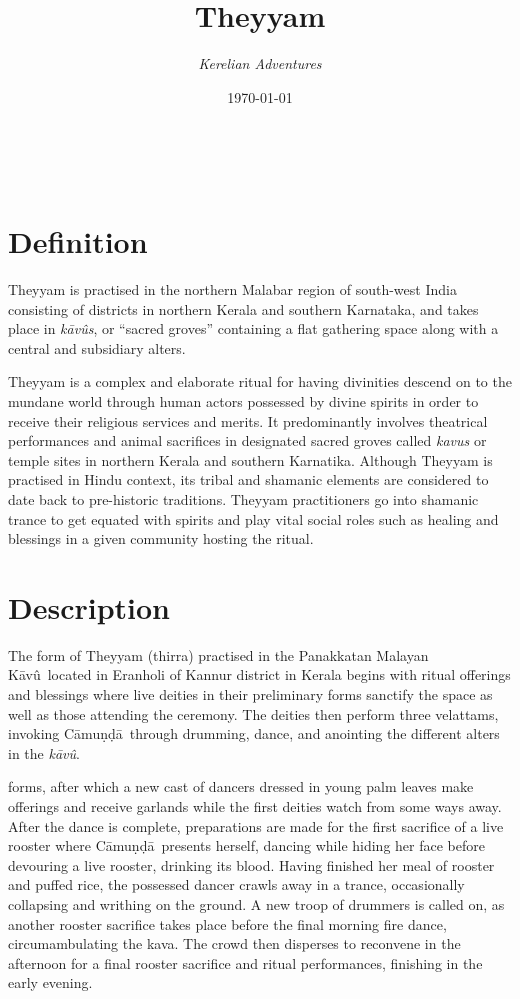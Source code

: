 \documentclass[a4paper, 11pt]{article} %
\title{\textbf{Theyyam}} %
\author{\textit{Kerelian Adventures}} %
\date{\today} %
\makeatletter
\newcommand{\camunda}[0]{C\={a}mu\d{n}\d{d}\={a}}
\newcommand{\kavu}[0]{\textit{k\={a}v\^{u}}}
\newcommand{\Kavu}[0]{K\={a}v\^{u}}
\renewcommand{\maketitle}{ %
\begin{flushright} %
{\LARGE\@title} %

\vspace{10pt} %

{\@author} %
\\\@date %

\vspace{30pt} %
\end{flushright}
}
\makeatother
\begin{document}
\maketitle %

\thispagestyle{empty}


\section{Definition}
  \label{sec:Definition}

Theyyam is practised in the northern Malabar region of south-west India consisting of districts in northern Kerala and southern Karnataka, and takes place in \textit{\kavu s}, or ``sacred groves'' containing a flat gathering space along with a central and subsidiary alters.

Theyyam is a complex and elaborate ritual for having divinities descend on to the mundane world through human actors possessed by divine spirits in order to receive their religious services and merits.
It predominantly involves theatrical performances and animal sacrifices in designated sacred groves called \textit{kavus} or temple sites in northern Kerala and southern Karnatika.
Although Theyyam is practised in Hindu context, its tribal and shamanic elements are considered to date back to pre-historic traditions.
Theyyam practitioners go into shamanic trance to get equated with spirits and play vital social roles such as healing and blessings in a given community hosting the ritual.

\section{Description}%
  \label{sec:Description}
  
The form of Theyyam (thirra) practised in the Panakkatan Malayan \Kavu\ located in Eranholi of Kannur district in Kerala begins with ritual offerings and blessings where live deities in their preliminary forms sanctify the space as well as those attending the ceremony.
The deities then perform three velattams, invoking \camunda\ through drumming, dance, and anointing the different alters in the \kavu.

forms, after which a new cast of dancers dressed in young palm leaves make offerings and receive garlands while the first deities watch from some ways away.
After the dance is complete, preparations are made for the first sacrifice of a live rooster where \camunda\ presents herself, dancing while hiding her face before devouring a live rooster, drinking its blood.
Having finished her meal of rooster and puffed rice, the possessed dancer crawls away in a trance, occasionally collapsing and writhing on the ground. 
A new troop of drummers is called on, as another rooster sacrifice takes place before the final morning fire dance, circumambulating the kava.
The crowd then disperses to reconvene in the afternoon for a final rooster sacrifice and ritual performances, finishing in the early evening.
\end{document}
